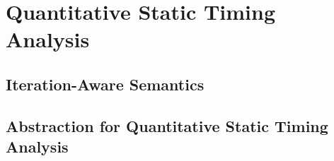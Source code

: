 \chapter{Quantitative Static Timing Analysis}


\section{Iteration-Aware Semantics}


\section{Abstraction for Quantitative Static Timing Analysis}
